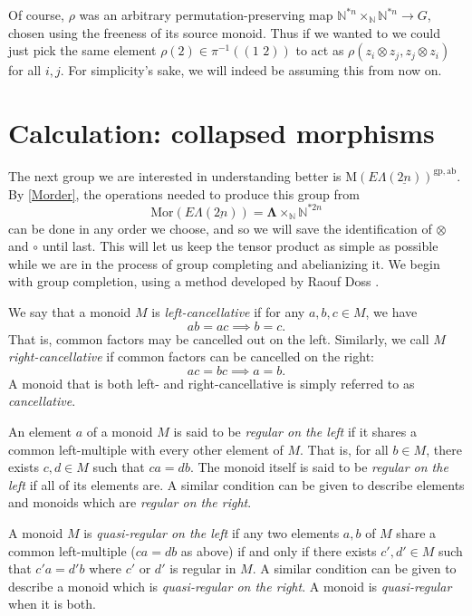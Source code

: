 \documentclass{amsbook} %
\newcommand{\ML}{\mathbf{\Lambda}}
\newcommand{\ELnn}{E\Lambda(\underline{2n})}
\newcommand{\ab}{\mathrm{ab}}
\newcommand{\gp}{\mathrm{gp}}
\newcommand{\trans}[2]{( #1 \, \, #2 )}
\numberwithin{section}{chapter}
\begin{document}
Of course, $\rho$ was an arbitrary permutation-preserving map $\mathbb{N}^{\ast n} \times_{\mathbb{N}} \mathbb{N}^{\ast n} \rightarrow G$, chosen using the freeness of its source monoid. Thus if we wanted to we could just pick the same element $\rho(2) \in \pi^{-1}(\trans{1}{2})$ to act as $\rho(z_i \otimes z_j, z_j \otimes z_i)$ for all $i, j$. For simplicity's sake, we will indeed be assuming this from now on.

\section{Calculation: collapsed morphisms}

The next group we are interested in understanding better is $\mathrm{M}(\ELnn)^{\gp,\ab}$. By \cref{Morder}, the operations needed to produce this group from
  \[
    \mathrm{Mor}(\ELnn) = \ML \times_{\mathbb{N}} \mathbb{N}^{\ast 2n}
  \]
can be done in any order we choose, and so we will save the identification of $\otimes$ and $\circ$ until last. This will let us keep the tensor product as simple as possible while we are in the process of group completing and abelianizing it. We begin with group completion, using a method developed by Raouf Doss \cite{doss-imm}.

\begin{Defi} We say that a monoid $M$ is \emph{left-cancellative} if for any $a, b, c \in M$, we have
  \[
    ab = ac \implies b = c.
  \]
That is, common factors may be cancelled out on the left. Similarly, we call $M$ \emph{right-cancellative} if common factors can be cancelled on the right:
  \[
    ac = bc \implies a = b.
  \]
A monoid that is both left- and right-cancellative is simply referred to as \emph{cancellative}.
\end{Defi}

\begin{Defi} An element $a$ of a monoid $M$ is said to be \emph{regular on the left} if it shares a common left-multiple with every other element of $M$. That is, for all $b \in M$, there exists $c, d \in M$ such that $ca = db$. The monoid itself is said to be \emph{regular on the left} if all of its elements are. A similar condition can be given to describe elements and monoids which are \emph{regular on the right}.

A monoid $M$ is \emph{quasi-regular on the left} if any two elements $a,b$ of $M$ share a common left-multiple ($ca = db$ as above) if and only if there exists $c', d' \in M$ such that $c'a = d'b$ where $c'$ or $d'$ is regular in $M$. A similar condition can be given to describe a monoid which is \emph{quasi-regular on the right}. A monoid is \emph{quasi-regular} when it is both.
\end{Defi}
\end{document}
